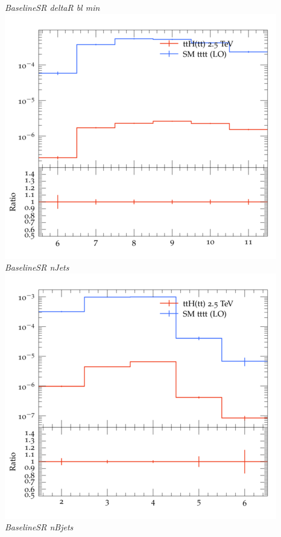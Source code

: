 \documentclass{beamer}
\begin{document}
\begin{frame}
\begin{columns}
\textit{\small BaselineSR deltaR bl min}
\includegraphics[width=\textwidth]{../plots/ttH_2500/tttt_ttH_1LOS/BaselineSR_nJets.png}\\
\textit{\small BaselineSR nJets}
\includegraphics[width=\textwidth]{../plots/ttH_2500/tttt_ttH_1LOS/BaselineSR_nBjets.png}\\
\textit{\small BaselineSR nBjets}
\end{columns}
\end{frame}
\end{document}
